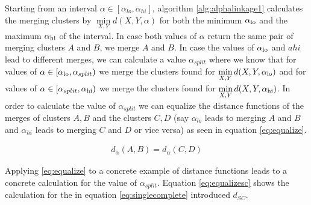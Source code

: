 Starting from an interval $\alpha \in [\alpha_{lo}, \alpha_{hi}]$, algorithm \ref{alg:alphalinkage1} calculates the merging clusters by $\min\limits_{X, Y} d(X,Y,\alpha)$ for both the minimum $\alpha_\text{lo}$ and the maximum $\alpha_\text{hi}$ of the interval. In case both values of $\alpha$ return the same pair of merging clusters $A$ and $B$, we merge $A$ and $B$. In case the values of $\alpha_\text{lo}$ and $ahi$ lead to different merges, we can calculate a value $\alpha_{split}$ where we know that for values of $\alpha \in [\alpha_\text{lo}, \alpha_{split})$ we merge the clusters found for $\min\limits_{X, Y} d(X,Y,\alpha_\text{lo})$ and for values of $\alpha \in [\alpha_{split}, \alpha_\text{hi})$ we merge the clusters found for $\min\limits_{X, Y} d(X,Y,\alpha_\text{hi})$. In order to calculate the value of $\alpha_{split}$ we can equalize the distance functions of the merges of clusters $A, B$ and the clusters $C, D$ (say $\alpha_{lo}$ leads to merging $A$ and $B$ and $\alpha_{hi}$ leads to merging $C$ and $D$ or vice versa) as seen in equation \ref{eq:equalize}. 

\begin{equation}
    \begin{aligned}
        d_{\alpha}(A,B) = d_{\alpha}(C,D)
    \end{aligned}
    \label{eq:equalize}
\end{equation}

Applying \ref{eq:equalize} to a concrete example of distance functions leads to a concrete calculation for the value of $\alpha_{split}$. Equation \ref{eq:equalizesc} shows the calculation for the in equation \ref{eq:singlecomplete} introduced $d_{SC}$.

